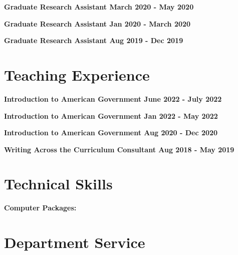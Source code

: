 \documentclass[margin]{res}
\newcommand{\fullhrulefill}{%
  \hspace*{-\sectionwidth}\hrulefill%
  }
\begin{document}
\begin{resume}
\textbf {Graduate Research Assistant \hfill {March 2020 - May 2020} \\ }

\textbf {Graduate Research Assistant \hfill {Jan 2020 - March 2020} \\ }

\textbf {Graduate Research Assistant \hfill {Aug 2019 - Dec 2019} \\ }


\fullhrulefill
\section {Teaching Experience}

\textbf {Introduction to American Government \hfill {June 2022 - July 2022} \\ }

\textbf {Introduction to American Government \hfill {Jan 2022 - May 2022} \\ }


\textbf {Introduction to American Government \hfill {Aug 2020 - Dec 2020} \\ }

\textbf {Writing Across the Curriculum Consultant \hfill {Aug 2018 - May 2019} \\ }

\fullhrulefill
\section{Technical Skills}
\textbf{Computer Packages:} 

\fullhrulefill
\section {Department Service}






\end{resume}
\(\)
\end{document}
